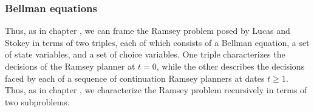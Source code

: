 \subsubsection{Bellman equations}
Thus, as in chapter , we can frame the Ramsey problem posed by Lucas and Stokey in terms of two triples, each of which consists of a Bellman equation, a set of state variables, and a set of choice variables. One triple characterizes the decisions of the Ramsey planner at  $t=0$, while the other  describes the decisions faced by each of a sequence of continuation Ramsey planners at dates $t \geq 1$.
Thus, as in chapter , we characterize the Ramsey problem recursively in terms of two subproblems.
%
%
%

